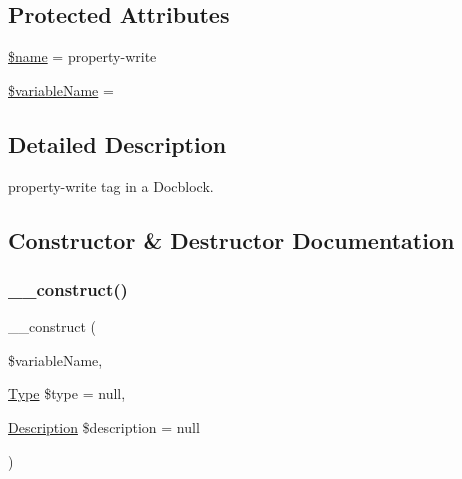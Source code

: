 \subsection*{Protected Attributes}
\begin{DoxyCompactItemize}
\item 
\mbox{\hyperlink{classphp_documentor_1_1_reflection_1_1_doc_block_1_1_tags_1_1_property_write_ab2fc40d43824ea3e1ce5d86dee0d763b}{\$name}} = \textquotesingle{}property-\/write\textquotesingle{}
\item 
\mbox{\hyperlink{classphp_documentor_1_1_reflection_1_1_doc_block_1_1_tags_1_1_property_write_a34a81eb3c92d37d458c6d18032faee7e}{\$variable\+Name}} = \textquotesingle{}\textquotesingle{}
\end{DoxyCompactItemize}


\subsection{Detailed Description}
property-\/write tag in a Docblock. 

\subsection{Constructor \& Destructor Documentation}
\mbox{\label{classphp_documentor_1_1_reflection_1_1_doc_block_1_1_tags_1_1_property_write_a1e5de5b31a43e9ffe064e27942aa5e63}} 
\subsubsection{\texorpdfstring{\+\_\+\+\_\+construct()}{\_\_construct()}}
{\footnotesize\ttfamily \+\_\+\+\_\+construct (\begin{DoxyParamCaption}\item[{}]{\$variable\+Name,  }\item[{\mbox{\hyperlink{interfacephp_documentor_1_1_reflection_1_1_type}{Type}}}]{\$type = {\ttfamily null},  }\item[{\mbox{\hyperlink{classphp_documentor_1_1_reflection_1_1_doc_block_1_1_description}{Description}}}]{\$description = {\ttfamily null} }\end{DoxyParamCaption})}


